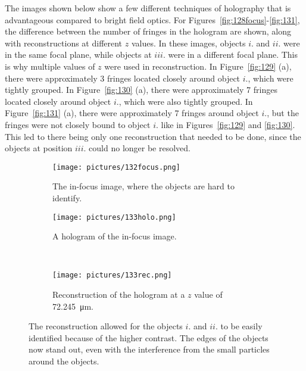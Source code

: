 The images shown below show a few different
techniques of holography that is advantageous compared to bright field optics.
For Figures~\ref{fig:128focus}-\ref{fig:131}, the difference between the number of fringes in the hologram
are shown, along with reconstructions at different $z$ values. In these images,
objects $i.$ and $ii.$ were in the same focal plane, while objects at $iii.$
were in
a different focal plane. This is why multiple values of $z$ were used in
reconstruction. In Figure~\ref{fig:129} (a), there were approximately 3 fringes
located closely around object $i.$, which were tightly grouped. In
Figure~\ref{fig:130} (a), there were approximately 7 fringes
located closely around object $i.$, which were also tightly grouped. In
Figure~\ref{fig:131} (a), there were approximately 7 fringes around object
$i.$, but the fringes were not closely bound to object $i.$ like in
Figures~\ref{fig:129} and \ref{fig:130}. This led to there being only one
reconstruction that needed to be done, since the objects at position $iii.$
could no longer be resolved.



\begin{figure}[ht!]
    \begin{center}

        \begin{subfigure}[t]{0.4\textwidth}
            \label{fig:132focus}
            \texttt{[image: pictures/132focus.png]}
            \caption{The in-focus image, where the objects are hard to
            identify.}
        \end{subfigure}
                \hspace*{\fill}
        \begin{subfigure}[t]{0.4\textwidth}
            \label{fig:133holo}
            \texttt{[image: pictures/133holo.png]}
            \caption{A hologram of the in-focus image.}%
        \end{subfigure}
        \\
        \begin{subfigure}[t]{\textwidth}
            \label{fig:133rec}
            \texttt{[image: pictures/133rec.png]}
            \caption{Reconstruction of the hologram at a $z$ value of \SI{72.245}{\micro\meter}.}
        \end{subfigure}


    \end{center}
    \caption{%
       The reconstruction allowed for the objects $i.$ and $ii.$ to be easily
       identified because of the higher contrast. The edges of the objects now
       stand out, even with the interference from the small particles around
       the objects.
    }%
    \label{fig:133}
\end{figure}

